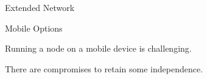 \documentclass[handout]{beamer}
\begin{document}
%		


\begin{frame}{Extended Network}
	\centering
	\begin{tikzpicture}[scale=1, every node/.style={scale=1}]
		
	\end{tikzpicture}
\end{frame}

\begin{frame}{Mobile Options}

	Running a node on a mobile device is challenging.
	\vspace{0.1cm}
	
	\begin{center}
		\begin{tikzpicture}[scale=1, every node/.style={scale=1}]
			
		\end{tikzpicture}
	\end{center}
	\vspace{0.8 cm}

	There are compromises to retain some independence.
	\vspace{0.1cm}
	
	\begin{center}
		\begin{tikzpicture}[scale=1, every node/.style={scale=1}]
			
		\end{tikzpicture}
	\end{center}

\end{frame}

\end{document}
